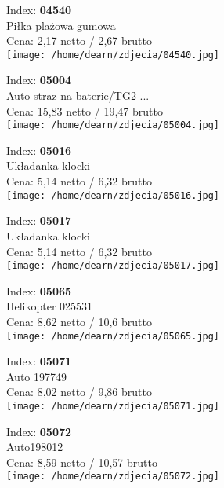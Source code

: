 {Index: \textbf{04540}\\
Piłka plażowa gumowa\\
Cena: 2,17 netto / 2,67 brutto\\
  \texttt{[image: /home/dearn/zdjecia/04540.jpg]}}\newline\newline

{Index: \textbf{05004}\\
Auto straz na baterie/TG2 ...\\
Cena: 15,83 netto / 19,47 brutto\\
  \texttt{[image: /home/dearn/zdjecia/05004.jpg]}}\newline\newline

{Index: \textbf{05016}\\
Układanka klocki\\
Cena: 5,14 netto / 6,32 brutto\\
  \texttt{[image: /home/dearn/zdjecia/05016.jpg]}}\newline\newline

{Index: \textbf{05017}\\
Układanka klocki\\
Cena: 5,14 netto / 6,32 brutto\\
  \texttt{[image: /home/dearn/zdjecia/05017.jpg]}}\newline\newline

{Index: \textbf{05065}\\
Helikopter 025531\\
Cena: 8,62 netto / 10,6 brutto\\
  \texttt{[image: /home/dearn/zdjecia/05065.jpg]}}\newline\newline

{Index: \textbf{05071}\\
Auto 197749\\
Cena: 8,02 netto / 9,86 brutto\\
  \texttt{[image: /home/dearn/zdjecia/05071.jpg]}}\newline\newline

{Index: \textbf{05072}\\
Auto198012\\
Cena: 8,59 netto / 10,57 brutto\\
  \texttt{[image: /home/dearn/zdjecia/05072.jpg]}}\newline\newline

